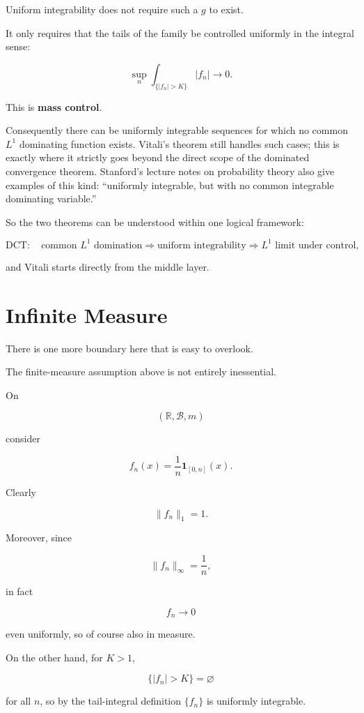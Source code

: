 \documentclass[11pt]{article}
\begin{document}
Uniform integrability does not require such a $g$ to exist.

It only requires that the tails of the family be controlled uniformly in the integral sense:

\[
\sup_n
\int_{\{|f_n|>K\}}|f_n|
\to0.
\]

This is \textbf{mass control}.

Consequently there can be uniformly integrable sequences for which no common $L^1$ dominating function exists. Vitali's theorem still handles such cases; this is exactly where it strictly goes beyond the direct scope of the dominated convergence theorem. Stanford's lecture notes on probability theory also give examples of this kind: ``uniformly integrable, but with no common integrable dominating variable.''

So the two theorems can be understood within one logical framework:

\[
\text{DCT}
:
\quad
\text{common }L^1\text{ domination}
\Longrightarrow
\text{uniform integrability}
\Longrightarrow
L^1\text{ limit under control},
\]

and Vitali starts directly from the middle layer.


\section{Infinite Measure}


There is one more boundary here that is easy to overlook.

The finite-measure assumption above is not entirely inessential.

On

\[
(\mathbb R,\mathcal B,m)
\]

consider

\[
f_n(x)
=
\frac1n\mathbf1_{[0,n]}(x).
\]

Clearly

\[
\|f_n\|_1=1.
\]

Moreover, since

\[
\|f_n\|_\infty=\frac1n,
\]

in fact

\[
f_n\to0
\]

even uniformly, so of course also in measure.

On the other hand, for $K>1$,

\[
\{|f_n|>K\}=\varnothing
\]

for all $n$, so by the tail-integral definition $\{f_n\}$ is uniformly integrable.
\end{document}
